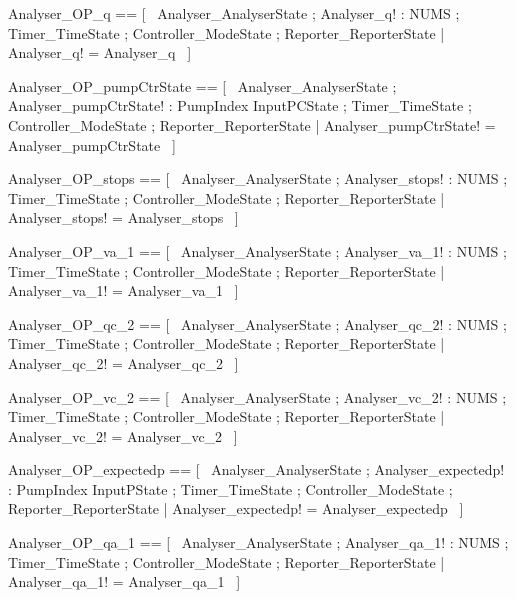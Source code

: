 \documentclass{article}
\begin{document}
\begin{zed}
	Analyser\_OP\_q == [~  \Xi Analyser\_AnalyserState ; Analyser\_q! : NUMS ; \Xi Timer\_TimeState ; \Xi Controller\_ModeState ; \Xi Reporter\_ReporterState | Analyser\_q! = Analyser\_q  ~]
\end{zed}

\begin{zed}
	Analyser\_OP\_pumpCtrState == [~  \Xi Analyser\_AnalyserState ; Analyser\_pumpCtrState! : PumpIndex \fun InputPCState ; \Xi Timer\_TimeState ; \Xi Controller\_ModeState ; \Xi Reporter\_ReporterState | Analyser\_pumpCtrState! = Analyser\_pumpCtrState  ~]
\end{zed}

\begin{zed}
	Analyser\_OP\_stops == [~  \Xi Analyser\_AnalyserState ; Analyser\_stops! : NUMS ; \Xi Timer\_TimeState ; \Xi Controller\_ModeState ; \Xi Reporter\_ReporterState | Analyser\_stops! = Analyser\_stops  ~]
\end{zed}

\begin{zed}
	Analyser\_OP\_va\_1 == [~  \Xi Analyser\_AnalyserState ; Analyser\_va\_1! : NUMS ; \Xi Timer\_TimeState ; \Xi Controller\_ModeState ; \Xi Reporter\_ReporterState | Analyser\_va\_1! = Analyser\_va\_1  ~]
\end{zed}

\begin{zed}
	Analyser\_OP\_qc\_2 == [~  \Xi Analyser\_AnalyserState ; Analyser\_qc\_2! : NUMS ; \Xi Timer\_TimeState ; \Xi Controller\_ModeState ; \Xi Reporter\_ReporterState | Analyser\_qc\_2! = Analyser\_qc\_2  ~]
\end{zed}

\begin{zed}
	Analyser\_OP\_vc\_2 == [~  \Xi Analyser\_AnalyserState ; Analyser\_vc\_2! : NUMS ; \Xi Timer\_TimeState ; \Xi Controller\_ModeState ; \Xi Reporter\_ReporterState | Analyser\_vc\_2! = Analyser\_vc\_2  ~]
\end{zed}

\begin{zed}
	Analyser\_OP\_expectedp == [~  \Xi Analyser\_AnalyserState ; Analyser\_expectedp! : PumpIndex \fun InputPState ; \Xi Timer\_TimeState ; \Xi Controller\_ModeState ; \Xi Reporter\_ReporterState | Analyser\_expectedp! = Analyser\_expectedp  ~]
\end{zed}

\begin{zed}
	Analyser\_OP\_qa\_1 == [~  \Xi Analyser\_AnalyserState ; Analyser\_qa\_1! : NUMS ; \Xi Timer\_TimeState ; \Xi Controller\_ModeState ; \Xi Reporter\_ReporterState | Analyser\_qa\_1! = Analyser\_qa\_1  ~]
\end{zed}
\end{document}
